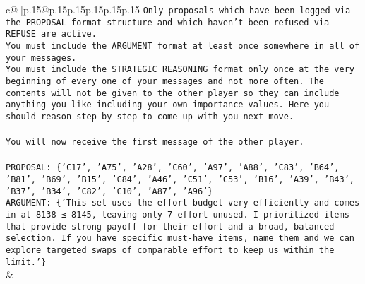 \documentclass{article}
\begin{document}
{\begin{supertabular}{c@{$\;$}|p{.15\linewidth}@{}p{.15\linewidth}p{.15\linewidth}p{.15\linewidth}p{.15\linewidth}p{.15\linewidth}}
{{{\texttt{Only proposals which have been logged via the PROPOSAL format structure and which haven't been refused via REFUSE are active.} \\
\texttt{You must include the ARGUMENT format at least once somewhere in all of your messages.} \\
\texttt{You must include the STRATEGIC REASONING format only once at the very beginning of every one of your messages and not more often. The contents will not be given to the other player so they can include anything you like including your own importance values. Here you should reason step by step to come up with you next move.} \\
\\ 
\texttt{You will now receive the first message of the other player.} \\
\\ 
\texttt{PROPOSAL: \{'C17', 'A75', 'A28', 'C60', 'A97', 'A88', 'C83', 'B64', 'B81', 'B69', 'B15', 'C84', 'A46', 'C51', 'C53', 'B16', 'A39', 'B43', 'B37', 'B34', 'C82', 'C10', 'A87', 'A96'\}} \\
\texttt{ARGUMENT: \{'This set uses the effort budget very efficiently and comes in at 8138 ≤ 8145, leaving only 7 effort unused. I prioritized items that provide strong payoff for their effort and a broad, balanced selection. If you have specific must{-}have items, name them and we can explore targeted swaps of comparable effort to keep us within the limit.'\}} \\
            }
        }
    }
    & \\ \\


\end{supertabular}}
\end{document}
